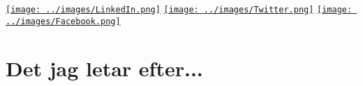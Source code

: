\documentclass[11pt,a4paper,sans]{moderncv}
\title{}
\begin{document}
\makecvtitle
\flushright
\vspace{-1.5cm}
\href{https://www.linkedin.com/in/chaimdemulder/}{\texttt{[image: ../images/LinkedIn.png]}}
\hspace{0.2cm}
\href{https://twitter.com/chaimdm}{\texttt{[image: ../images/Twitter.png]}} 
\hspace{0.2cm}
\href{https://www.facebook.com/chaim.demulder/}{\texttt{[image: ../images/Facebook.png]}}
\vfill
\section{Det jag letar efter...}
\vfill
\end{document}
